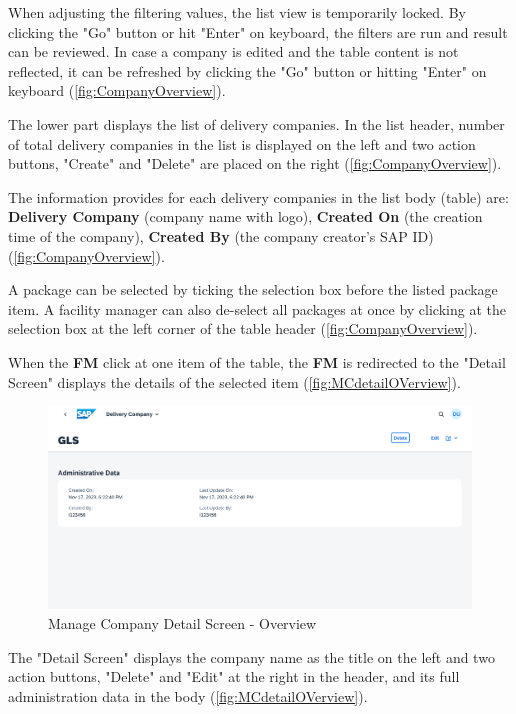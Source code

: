 When adjusting the filtering values, the list view is temporarily locked. By clicking the "Go" button or hit "Enter" on keyboard, the filters are run and result can be reviewed. In case a company is edited and the table content is not reflected, it can be refreshed by clicking the "Go" button or hitting "Enter" on keyboard (\autoref{fig:CompanyOverview}). 

The lower part displays the list of delivery companies. In the list header, number of total delivery companies in the list is displayed on the left and two action buttons, "Create" and "Delete" are placed on the right (\autoref{fig:CompanyOverview}). 

The information provides for each delivery companies in the list body (table) are: \textbf{Delivery Company} (company name with logo), \textbf{Created On} (the creation time of the company), \textbf{Created By} (the company creator's SAP ID) (\autoref{fig:CompanyOverview}). 

A package can be selected by ticking the selection box before the listed package item. A facility manager can also de-select all packages at once by clicking at the selection box at the left corner of the table header (\autoref{fig:CompanyOverview}). 

\bigskip

When the \textbf{FM} click at one item of the table, the \textbf{FM} is redirected to the "Detail Screen" displays the details of the selected item (\autoref{fig:MCdetailOVerview}). 

\begin{figure}[H]
	\centering
	\includegraphics[width=1\linewidth]{images/user_doc/company/detail/DetailOverview.png}
	\caption{Manage Company Detail Screen - Overview}
	\label{fig:MCdetailOVerview}
\end{figure}

The "Detail Screen" displays the company name as the title on the left and two action buttons, "Delete" and "Edit" at the right in the header, and its full administration data in the body (\autoref{fig:MCdetailOVerview}). 

